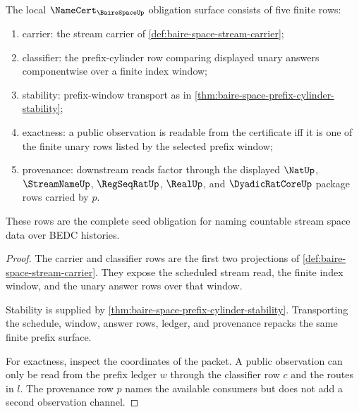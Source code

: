 \begin{theorem}
\label{thm:baire-space-namecert-obligations}
The local $\NameCert_{\BaireSpaceUp}$ obligation surface consists of five
finite rows:
\begin{enumerate}
\item carrier: the stream carrier of
\autoref{def:baire-space-stream-carrier};
\item classifier: the prefix-cylinder row comparing displayed unary answers
componentwise over a finite index window;
\item stability: prefix-window transport as in
\autoref{thm:baire-space-prefix-cylinder-stability};
\item exactness: a public observation is readable from the certificate iff it
is one of the finite unary rows listed by the selected prefix window;
\item provenance: downstream reads factor through the displayed $\NatUp$,
$\StreamNameUp$, $\RegSeqRatUp$, $\RealUp$, and $\DyadicRatCoreUp$ package
rows carried by $p$.
\end{enumerate}
These rows are the complete seed obligation for naming countable stream space
data over BEDC histories.
\end{theorem}
\begin{proof}
The carrier and classifier rows are the first two projections of
\autoref{def:baire-space-stream-carrier}. They expose the scheduled stream
read, the finite index window, and the unary answer rows over that window.

Stability is supplied by
\autoref{thm:baire-space-prefix-cylinder-stability}. Transporting the
schedule, window, answer rows, ledger, and provenance repacks the same finite
prefix surface.

For exactness, inspect the coordinates of the packet. A public observation can
only be read from the prefix ledger $w$ through the classifier row $c$ and the
routes in $l$. The provenance row $p$ names the available consumers but does
not add a second observation channel.
\end{proof}

